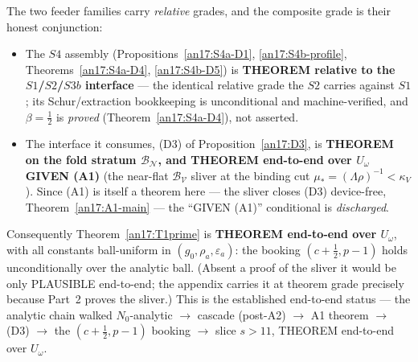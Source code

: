 \begin{remark}
\label{an17:T1prime-grade}
The two feeder families carry \emph{relative} grades, and the composite grade is
their honest conjunction:
\begin{itemize}
\item The $S4$ assembly (Propositions~\ref{an17:S4a-D1}, \ref{an17:S4b-profile},
 Theorems~\ref{an17:S4a-D4}, \ref{an17:S4b-D5}) is \textbf{THEOREM relative to the
 $S1$/$S2$/$S3b$ interface} --- the identical relative grade the $S2$
 carries against $S1$; its Schur/extraction bookkeeping is unconditional and
 machine-verified, and $\beta=\tfrac12$ is \emph{proved}
 (Theorem~\ref{an17:S4a-D4}), not asserted.
\item The interface it consumes, (D3) of Proposition~\ref{an17:D3}, is
 \textbf{THEOREM on the fold stratum $\mathcal B_{\mathcal N}$, and THEOREM
 end-to-end over $U_\omega$ GIVEN (A1)} (the near-flat $\mathcal B_{\mathcal V}$
 sliver at the binding cut $\mu_*=(\Lambda\rho)^{-1}<\kappa_V$). Since (A1) is
 itself a theorem here --- the sliver closes (D3) device-free,
 Theorem~\ref{an17:A1-main} --- the ``GIVEN (A1)'' conditional is
 \emph{discharged}.
\end{itemize}
Consequently Theorem~\ref{an17:T1prime} is \textbf{THEOREM end-to-end over
$U_\omega$}, with all constants ball-uniform in $(g_0,\rho_a,\varepsilon_a)$: the
booking $(c+\tfrac12,p-1)$ holds unconditionally over the analytic ball. (Absent a
proof of the sliver it would be only PLAUSIBLE end-to-end; the appendix carries it
at theorem grade precisely because Part~2 proves the sliver.) This is the
established end-to-end status --- the analytic chain
walked $N_0$-analytic $\to$ cascade (post-A2) $\to$ A1 theorem $\to$ (D3) $\to$
the $(c+\tfrac12,p-1)$ booking $\to$ slice $s>11$, THEOREM end-to-end over
$U_\omega$.
\end{remark}

